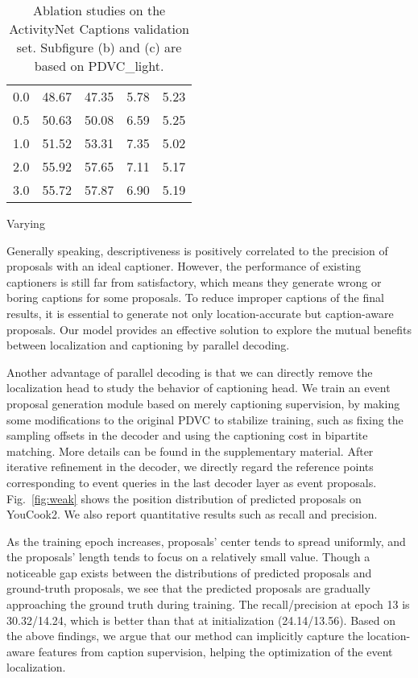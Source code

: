 \begin{table*}[h]
\begin{subtable}[h]{0.2\textwidth}
{\begin{tabular}{c c c c c}
\midrule
0.0 & 48.67 & 47.35 & 5.78 & 5.23  \\
                0.5 & 50.63 & 50.08 & 6.59 & 5.25 \\
                1.0 & 51.52 & 53.31 & 7.35 & 5.02 \\ {2.0} & 55.92 & 57.65 & 7.11 & {5.17} \\
                3.0  & 55.72 & 57.87 & 6.90 & 5.19 \\
                \bottomrule
            \end{tabular}}
\caption{Varying }
            \label{table:gamma}
    \end{subtable}
     \caption{Ablation studies on the ActivityNet Captions validation set. Subfigure (b) and (c) are based on PDVC\_light.}
     \vspace{-1em}
     \label{tab:temps}
\end{table*}

Generally speaking, descriptiveness is positively correlated to the precision of proposals with an ideal captioner. However, the performance of existing captioners is still far from satisfactory, which means they generate wrong or boring captions for some proposals. To reduce improper captions of the final results, it is essential to generate not only location-accurate but caption-aware proposals. Our model provides an effective solution to explore the mutual benefits between localization and captioning by parallel decoding.

\vspace{0.5em}
 Another advantage of parallel decoding is that we can directly remove the localization head to study the behavior of captioning head. We train an event proposal generation module based on merely captioning supervision, by making some modifications to the original PDVC to stabilize training, such as fixing the sampling offsets in the decoder and using the captioning cost in bipartite matching. More details can be found in the supplementary material. After iterative refinement in the decoder, we directly regard the reference points corresponding to event queries in the last decoder layer as event proposals. Fig.~\ref{fig:weak} shows the position distribution of predicted proposals on YouCook2. We also report quantitative results such as recall and precision.

As the training epoch increases, proposals' center tends to spread uniformly, and the proposals' length tends to focus on a relatively small value. Though a noticeable gap exists between the distributions of predicted proposals and ground-truth proposals, we see that the predicted proposals are gradually approaching the ground truth during training. The recall/precision at epoch 13 is 30.32/14.24, which is better than that at initialization (24.14/13.56). Based on the above findings, we argue that our method can implicitly capture the location-aware features from caption supervision, helping the optimization of the event localization.

